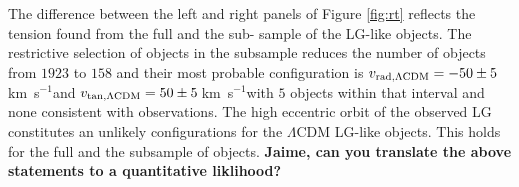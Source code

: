 \documentclass{emulateapj}
\newcommand{\kms}{\,km~s$^{-1}$}
\newcommand{\Msun}{{\ifmmode{{\rm {M_{\odot}}}}\else{${\rm{M_{\odot}}}$}\fi}}
\begin{document}
The difference between the left and right panels of Figure \ref{fig:rt} reflects  the tension found from the full and the sub- sample of the LG-like objects. %
The restrictive selection of objects in the subsample reduces the number of objects from  $1923$   to $158$ and their most probable configuration is $v_{\rm rad,\Lambda CDM} = -50\pm5$\kms and $v_{\rm tan,\Lambda CDM} = 50\pm5$\kms with $5$ objects within that interval and none consistent with observations. 
The high eccentric orbit of the observed LG  constitutes an unlikely configurations for the $\Lambda$CDM LG-like objects. This holds for the full and the subsample of objects. 
{\bf Jaime, can you translate the above statements to a quantitative  liklihood?}
\end{document}
